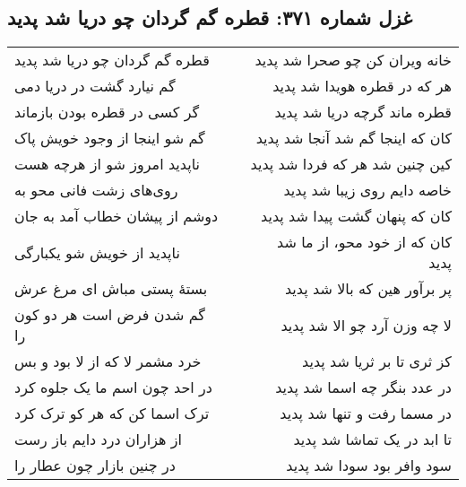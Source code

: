 \begin{center}
\section*{غزل شماره ۳۷۱: قطره گم گردان چو دریا شد پدید}
\label{sec:371}
\begin{longtable}{l p{0.5cm} r}
قطره گم گردان چو دریا شد پدید
&&
خانه ویران کن چو صحرا شد پدید
\\
گم نیارد گشت در دریا دمی
&&
هر که در قطره هویدا شد پدید
\\
گر کسی در قطره بودن بازماند
&&
قطره ماند گرچه دریا شد پدید
\\
گم شو اینجا از وجود خویش پاک
&&
کان که اینجا گم شد آنجا شد پدید
\\
ناپدید امروز شو از هرچه هست
&&
کین چنین شد هر که فردا شد پدید
\\
روی‌های زشت فانی محو به
&&
خاصه دایم روی زیبا شد پدید
\\
دوشم از پیشان خطاب آمد به جان
&&
کان که پنهان گشت پیدا شد پدید
\\
ناپدید از خویش شو یکبارگی
&&
کان که از خود محو، از ما شد پدید
\\
بستهٔ پستی مباش ای مرغ عرش
&&
پر برآور هین که بالا شد پدید
\\
گم شدن فرض است هر دو کون را
&&
لا چه وزن آرد چو الا شد پدید
\\
خرد مشمر لا که از لا بود و بس
&&
کز ثری تا بر ثریا شد پدید
\\
در احد چون اسم ما یک جلوه کرد
&&
در عدد بنگر چه اسما شد پدید
\\
ترک اسما کن که هر کو ترک کرد
&&
در مسما رفت و تنها شد پدید
\\
از هزاران درد دایم باز رست
&&
تا ابد در یک تماشا شد پدید
\\
در چنین بازار چون عطار را
&&
سود وافر بود سودا شد پدید
\\
\end{longtable}
\end{center}
